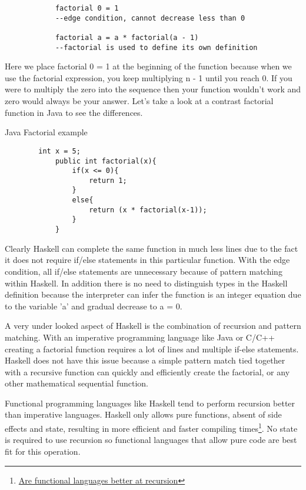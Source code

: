 \documentclass{article}
\begin{document}
        \begin{lstlisting}
            factorial 0 = 1
            --edge condition, cannot decrease less than 0
            
            factorial a = a * factorial(a - 1)
            --factorial is used to define its own definition
        \end{lstlisting}
        
        \noindent Here we place factorial 0 = 1 at the beginning of the function because when we use the factorial expression, you keep multiplying n - 1 until you reach 0. If you were to multiply the zero into the sequence then your function wouldn't work and zero would always be your answer. Let's take a look at a contrast factorial function in Java to see the differences.
        
        \medskip
        \caption{Java Factorial example}
        \begin{lstlisting}
        int x = 5;
            public int factorial(x){
                if(x <= 0){
                    return 1;
                }
                else{
                    return (x * factorial(x-1));
                }
            }
        \end{lstlisting}
        Clearly Haskell can complete the same function in much less lines due to the fact it does not require if/else statements in this particular function. With the edge condition, all if/else statements are unnecessary because of pattern matching within Haskell. In addition there is no need to distinguish types in the Haskell definition because the interpreter can infer the function is an integer equation due to the variable 'a' and gradual decrease to a = 0.
        
        \medskip
        \noindent A very under looked aspect of Haskell is the combination of recursion and pattern matching. With an imperative programming language like Java or C/C++ creating a factorial function requires a lot of lines and multiple if-else statements. Haskell does not have this issue because a simple pattern match tied together with a recursive function can quickly and efficiently create the factorial, or any other mathematical sequential function.
        
        \medskip
        \noindent Functional programming languages like Haskell tend to perform recursion better than imperative languages. Haskell only allows pure functions, absent of side effects and state, resulting in more efficient and faster compiling times\footnote{\href{https://softwareengineering.stackexchange.com/questions/149167/are-functional-languages-better-at-recursion}{Are functional languages better at recursion}}. No state is required to use recursion so functional languages that allow pure code are best fit for this operation.
        
\end{document}
